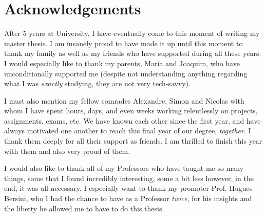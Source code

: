
\chapter*{Acknowledgements}
After 5 years at University, I have eventually come to this moment of writing my master thesis. I am insanely proud to have made it up until this moment to thank my family as well as my friends who have supported during all these years. 
I would especially like to thank my parents, Maria and Joaquim, who have unconditionally supported me (despite not understanding anything regarding what I was \emph{exactly} studying, they are not very tech-savvy).

I must also mention my fellow comrades Alexandre, Simon and Nicolas with whom I have spent hours, days, and even weeks working relentlessly on projects, assignments, exams, etc. We have known each other since the first year, and have always motivated one another to reach this final year of our degree, \emph{together}. I thank them deeply for all their support as friends. I am thrilled to finish this year with them and also very proud of them.

I would also like to thank all of my Professors who have taught me so many things, some that I found incredibly interesting, some a bit less however, in the end, it was all necessary. I especially want to thank my promoter Prof. Hugues Bersini, who I had the chance to have as a Professor \emph{twice}, for his insights and the liberty he allowed me to have to do this thesis.